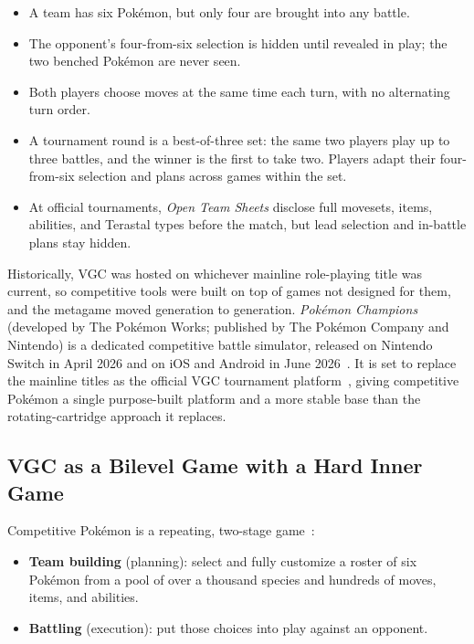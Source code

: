 \begin{itemize}
  \item A team has six Pok\'{e}mon, but only four are brought into any battle.
  \item The opponent's four-from-six selection is hidden until revealed in play;
        the two benched Pok\'{e}mon are never seen.
  \item Both players choose moves at the same time each turn, with no alternating
        turn order.
  \item A tournament round is a best-of-three set: the same two players play up to
        three battles, and the winner is the first to take two. Players adapt their
        four-from-six selection and plans across games within the set.
  \item At official tournaments, \emph{Open Team Sheets} disclose full movesets,
        items, abilities, and Terastal types before the match, but lead selection
        and in-battle plans stay hidden.
\end{itemize}

Historically, VGC was hosted on whichever mainline role-playing title was
current, so competitive tools were built on top of games not designed for them,
and the metagame moved generation to generation. \emph{Pok\'{e}mon Champions}
(developed by The Pok\'{e}mon Works; published by The Pok\'{e}mon Company and
Nintendo) is a dedicated competitive battle simulator, released on Nintendo
Switch in April 2026 and on iOS and Android in June
2026~\cite{pokemon_champions_wiki}. It is set to replace the mainline titles as
the official VGC tournament platform~\cite{pokemon_champions_official}, giving
competitive Pok\'{e}mon a single purpose-built platform and a more stable base
than the rotating-cartridge approach it replaces.

\subsection{VGC as a Bilevel Game with a Hard Inner Game}

Competitive Pok\'{e}mon is a repeating, two-stage game~\cite{traylor_vgc}:

\begin{itemize}
  \item \textbf{Team building} (planning): select and fully customize a roster of
        six Pok\'{e}mon from a pool of over a thousand species and hundreds of
        moves, items, and abilities.
  \item \textbf{Battling} (execution): put those choices into play against an
        opponent.
\end{itemize}

